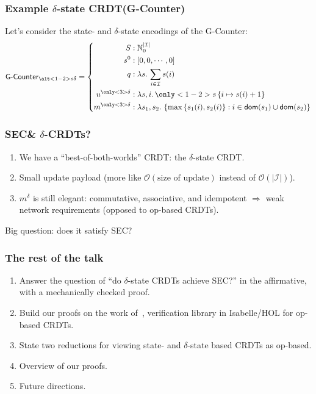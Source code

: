 \documentclass[aspectratio=169,compress,handout]{beamer}
\newcommand*{\CRDT}{\textsf{CRDT}\xspace}
\newcommand*{\CRDTs}{\textsf{CRDTs}\xspace}
\newcommand*{\SEC}{\textsf{SEC}\xspace}
\begin{document}
  \begin{frame}
    \frametitle{Example $\delta$-state \CRDT (G-Counter)}

    Let's consider the state- and $\delta$-state encodings of the G-Counter:
    \pause
    \[
      \textsf{G-Counter}_{\alt<1-2>{s}{\delta}} = \left\{\begin{aligned}
        S &: \mathbb{N}_0^{|\mathcal{I}|} \\
        s^0 &: \left[ 0, 0, \cdots, 0 \right] \\
        q &: \lambda s.\, \sum_{i \in \mathcal{I}} s(i) \\
        u^{\only<3>{\delta}} &: \lambda s,i.\, \only<1-2>{s}\left\{ i \mapsto s(i) + 1 \right\} \\
        m^{\only<3>{\delta}} &: \lambda s_1, s_2.\, \left\{ \max\left\{ s_1(i), s_2(i) \right\}: i \in \mathsf{dom}(s_1) \cup
        \mathsf{dom}(s_2) \right\}
      \end{aligned}\right.
    \]
    \pause
  \end{frame}

  \begin{frame}
    \frametitle{\SEC \& $\delta$-\CRDTs?}

    \begin{enumerate}[<+->]
      \item We have a ``best-of-both-worlds'' \CRDT: the $\delta$-state \CRDT.
      \item Small update payload (more like $\mathcal{O}(\text{size of update})$
        instead of $\mathcal{O}(|\mathcal{I}|)$).
      \item $m^\delta$ is still elegant: commutative, associative, and
        idempotent $\Rightarrow$ weak network requirements (opposed to op-based
        \CRDTs).
    \end{enumerate}

    \pause
    Big question: does it satisfy SEC?
  \end{frame}

  \begin{frame}
    \frametitle{The rest of the talk}
    \begin{enumerate}[<+->]
      \item Answer the question of ``do $\delta$-state \CRDTs achieve \SEC?'' in
        the affirmative, with a mechanically checked proof.
      \item Build our proofs on the work of~\citet{gomes17}, verification
        library in Isabelle/HOL for op-based \CRDTs.
      \item State two reductions for viewing state- and $\delta$-state based
        \CRDTs as op-based.
      \item Overview of our proofs.
      \item Future directions.
    \end{enumerate}
  \end{frame}
\end{document}
